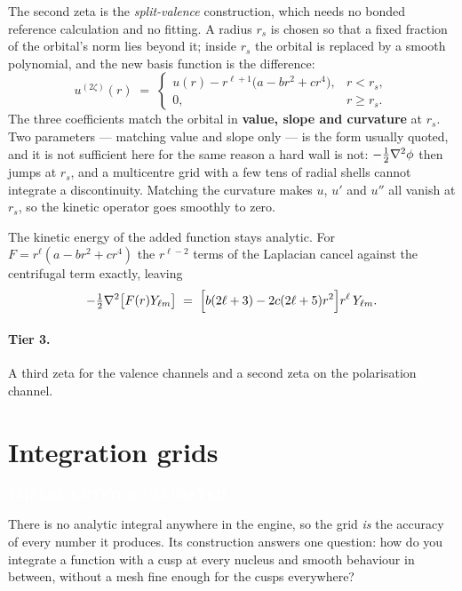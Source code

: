 \documentclass[11pt,a4paper]{article}
\newcommand{\badge}[2]{%
  \par\vspace{2pt}\noindent
  \colorbox{#1}{\textcolor{white}{\small\bfseries\,#2\,}}\par\vspace{4pt}}
\newcommand{\implemented}{\badge{okgreen}{IMPLEMENTED \& VALIDATED}}
\begin{document}
The second zeta is the \emph{split-valence} construction, which needs no
bonded reference calculation and no fitting. A radius $r_s$ is chosen so that
a fixed fraction of the orbital's norm lies beyond it; inside $r_s$ the
orbital is replaced by a smooth polynomial, and the new basis function is the
difference:
\begin{equation}
  u^{(2\zeta)}(r) \;=\;
  \begin{cases}
    u(r) - r^{\ell+1}\bigl(a - b r^2 + c r^4\bigr), & r < r_s,\\[4pt]
    0, & r \ge r_s .
  \end{cases}
  \label{eq:split}
\end{equation}
The three coefficients match the orbital in \textbf{value, slope and
curvature} at $r_s$. Two parameters --- matching value and slope only --- is
the form usually quoted, and it is not sufficient here for the same reason a
hard wall is not: $-\tfrac12\laplacian\phi$ then jumps at $r_s$, and a
multicentre grid with a few tens of radial shells cannot integrate a
discontinuity. Matching the curvature makes $u$, $u'$ and $u''$ all vanish at
$r_s$, so the kinetic operator goes smoothly to zero.

The kinetic energy of the added function stays analytic. For
$F = r^\ell(a - br^2 + cr^4)$ the $r^{\ell-2}$ terms of the Laplacian cancel
against the centrifugal term exactly, leaving
\begin{equation}
  -\tfrac12 \laplacian \bigl[F(r) Y_{\ell m}\bigr]
  \;=\; \Bigl[ b(2\ell+3) - 2c(2\ell+5)r^2 \Bigr] r^{\ell}\, Y_{\ell m}.
  \label{eq:splitkinetic}
\end{equation}

\paragraph{Tier 3.} A third zeta for the valence channels and a second zeta on
the polarisation channel.

\section{Integration grids}
\label{sec:grids}
\implemented

There is no analytic integral anywhere in the engine, so the grid \emph{is}
the accuracy of every number it produces. Its construction answers one
question: how do you integrate a function with a cusp at every nucleus and
smooth behaviour in between, without a mesh fine enough for the cusps
everywhere?
\end{document}
